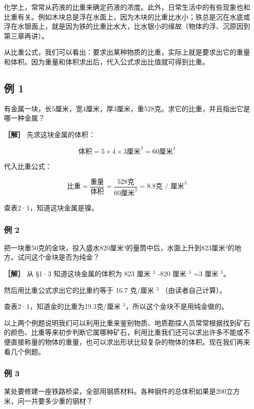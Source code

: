 化学上，常常从药液的比重来确定药液的浓度。此外，日常生活中的有些现象也和比重有关。例如木块总是浮在水面上，因为木块的比重比水小；铁总是沉在水底或浮在水银面上，就是因为铁的比重比水大，比水银小的缘故（物体的浮、沉原因到第三章再讲）。

从比重公式，我们可以看出：要求出某种物质的比重，实际上就是要求出它的重量和体积。因为重量和体积求出后，代入公式求出比值就可得到比重。

\subsection{例 1}\label{ux4f8b-1}

有金属一块，长5厘米，宽4厘米，厚3厘米，重528克。求它的比重，并且指出它是哪一种金属？

\textbf{［解］} 先求这块金属的体积：

\[
\mathrm{体积} = 5 \times 4 \times 3 \mathrm{厘米} ^ {3} = 60 \mathrm{厘米} ^ {3}
\]

代入比重公式：

\[
\text{比重} = \frac {\text{重量}}{\text{体积}} = \frac {528 \text{克}}{60 \text{厘米} ^ {3}} = 8.8 \text{克 / 厘米} ^ {3}
\]

查表2·1，知道这块金属是镍。

\subsubsection{例 2}\label{ux4f8b-2}

把一块重50克的金块，投入盛水820厘米³的量筒中后，水面上升到823厘米³的地方。试问这个金块是否为纯金？

\textbf{［解］} 从 §1·3 知道这块金属的体积为 823 厘米 \(^{3}\) -820 厘米
\(^{3}\) =3 厘米 \(^{3}\)。

然后用比重公式求出它的比重约等于 16.7 克/厘米 \(^{3}\)
（由读者自己计算）。

查表2·1，知道金的比重为19.3克/厘米
\(^{3}\)，所以这个金块不是用纯金做的。

以上两个例题说明我们可以利用比重来鉴别物质、地质勘探人员常常根据找到矿石的颜色、比重等来初步判断它属哪种矿石，利用比重我们还可以求出许多不能或不便直接称量的物体的重量，也可以求出形状比较复杂的物体的体积。现在我们再来看几个例题。

\subsubsection{例 3}\label{ux4f8b-3}

某处要修建一座铁路桥梁，全部用钢质材料。各种钢件的总体积如果是200立方米，问一共要多少重的钢材？

